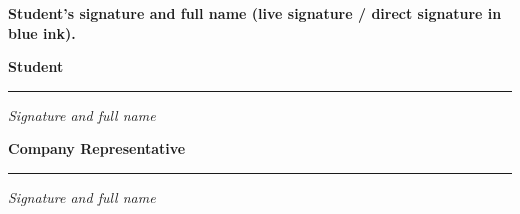 \documentclass[a4paper]{article}
\theoremstyle{definition}
\begin{document}
\clearpage
\thispagestyle{fancy}

\vspace*{1.2cm}
\noindent
\textbf{Student's signature and full name (live signature / direct signature in blue ink).}

\vspace{2.0cm}

\noindent
\begin{minipage}[t]{0.46\textwidth}
  \centering
  \textbf{Student}

  \vspace{4.5cm}

  \rule{0.85\linewidth}{0.4pt}

  \vspace{0.3cm}
  \textit{Signature and full name}
\end{minipage}
\hfill
\begin{minipage}[t]{0.46\textwidth}
  \centering
  \textbf{Company Representative}

  \vspace{4.5cm}

  \rule{0.85\linewidth}{0.4pt}

  \vspace{0.3cm}
  \textit{Signature and full name}
\end{minipage}
\end{document}

